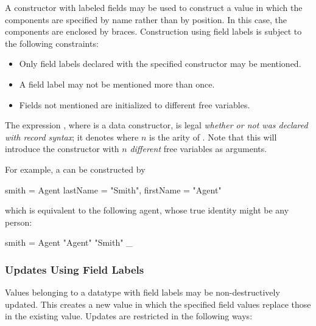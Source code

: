 A constructor with labeled fields may be used to construct a value in
which the components are specified by name rather than by
position. In this case, the components are enclosed by braces.
Construction using field labels is subject to the following
constraints:
%
\begin{itemize}
\item Only field labels declared with the specified constructor may be
  mentioned.
\item A field label may not be mentioned more than once.
\item Fields not mentioned are initialized to different free variables.
\end{itemize}
%
The expression , where  is a data constructor,
is legal \emph{whether or not   was declared with record syntax};
it denotes 
where $n$ is the arity of .
Note that this will introduce the constructor  with
$n$ \emph{different} free variables as arguments.


\noindent
For example, a  can be constructed by
\begin{curry}
smith = Agent { lastName = "Smith", firstName = "Agent" }
\end{curry}
which is equivalent to the following agent, whose true identity
might be any person:
\begin{curry}
smith = Agent "Agent" "Smith" _
\end{curry}

\subsubsection{Updates Using Field Labels}\label{flab-upd}

Values belonging to a datatype with field labels may be
non-destructively updated. This creates a new value in which the
specified field values replace those in the existing value. Updates
are restricted in the following ways:

